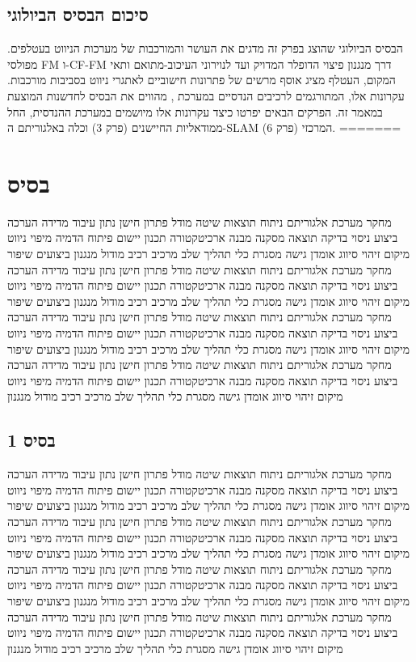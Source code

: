 \subsection{סיכום הבסיס הביולוגי}
\label{sec:ch02_summary}

הבסיס הביולוגי שהוצג בפרק זה מדגים את העושר והמורכבות של מערכות הניווט בעטלפים. מפולסי FM ו-CF-FM דרך מנגנון פיצוי הדופלר המדויק ועד לנוירוני העיכוב-מתואם ותאי המקום, העטלף מציג אוסף מרשים של פתרונות חישוביים לאתגרי ניווט בסביבות מורכבות. עקרונות אלו, המתורגמים לרכיבים הנדסיים במערכת , מהווים את הבסיס לחדשנות המוצעת במאמר זה. הפרקים הבאים יפרטו כיצד עקרונות אלו מיושמים במערכת ההנדסית, החל ממודאליות החיישנים (פרק 3) וכלה באלגוריתם ה-SLAM המרכזי (פרק 6).
=======
\section{בסיס}
\label{sec:ch02}

מחקר מערכת אלגוריתם ניתוח תוצאות שיטה מודל פתרון חישן נתון עיבוד מדידה הערכה ביצוע ניסוי בדיקה תוצאה מסקנה מבנה ארכיטקטורה תכנון יישום פיתוח הדמיה מיפוי ניווט מיקום זיהוי סיווג אומדן גישה מסגרת כלי תהליך שלב מרכיב רכיב מודול מנגנון ביצועים שיפור מחקר מערכת אלגוריתם ניתוח תוצאות שיטה מודל פתרון חישן נתון עיבוד מדידה הערכה ביצוע ניסוי בדיקה תוצאה מסקנה מבנה ארכיטקטורה תכנון יישום פיתוח הדמיה מיפוי ניווט מיקום זיהוי סיווג אומדן גישה מסגרת כלי תהליך שלב מרכיב רכיב מודול מנגנון ביצועים שיפור מחקר מערכת אלגוריתם ניתוח תוצאות שיטה מודל פתרון חישן נתון עיבוד מדידה הערכה ביצוע ניסוי בדיקה תוצאה מסקנה מבנה ארכיטקטורה תכנון יישום פיתוח הדמיה מיפוי ניווט מיקום זיהוי סיווג אומדן גישה מסגרת כלי תהליך שלב מרכיב רכיב מודול מנגנון ביצועים שיפור מחקר מערכת אלגוריתם ניתוח תוצאות שיטה מודל פתרון חישן נתון עיבוד מדידה הערכה ביצוע ניסוי בדיקה תוצאה מסקנה מבנה ארכיטקטורה תכנון יישום פיתוח הדמיה מיפוי ניווט מיקום זיהוי סיווג אומדן גישה מסגרת כלי תהליך שלב מרכיב רכיב מודול מנגנון

\subsection{בסיס 1}
\label{sub:ch02_1}
מחקר מערכת אלגוריתם ניתוח תוצאות שיטה מודל פתרון חישן נתון עיבוד מדידה הערכה ביצוע ניסוי בדיקה תוצאה מסקנה מבנה ארכיטקטורה תכנון יישום פיתוח הדמיה מיפוי ניווט מיקום זיהוי סיווג אומדן גישה מסגרת כלי תהליך שלב מרכיב רכיב מודול מנגנון ביצועים שיפור מחקר מערכת אלגוריתם ניתוח תוצאות שיטה מודל פתרון חישן נתון עיבוד מדידה הערכה ביצוע ניסוי בדיקה תוצאה מסקנה מבנה ארכיטקטורה תכנון יישום פיתוח הדמיה מיפוי ניווט מיקום זיהוי סיווג אומדן גישה מסגרת כלי תהליך שלב מרכיב רכיב מודול מנגנון ביצועים שיפור מחקר מערכת אלגוריתם ניתוח תוצאות שיטה מודל פתרון חישן נתון עיבוד מדידה הערכה ביצוע ניסוי בדיקה תוצאה מסקנה מבנה ארכיטקטורה תכנון יישום פיתוח הדמיה מיפוי ניווט מיקום זיהוי סיווג אומדן גישה מסגרת כלי תהליך שלב מרכיב רכיב מודול מנגנון ביצועים שיפור מחקר מערכת אלגוריתם ניתוח תוצאות שיטה מודל פתרון חישן נתון עיבוד מדידה הערכה ביצוע ניסוי בדיקה תוצאה מסקנה מבנה ארכיטקטורה תכנון יישום פיתוח הדמיה מיפוי ניווט מיקום זיהוי סיווג אומדן גישה מסגרת כלי תהליך שלב מרכיב רכיב מודול מנגנון

